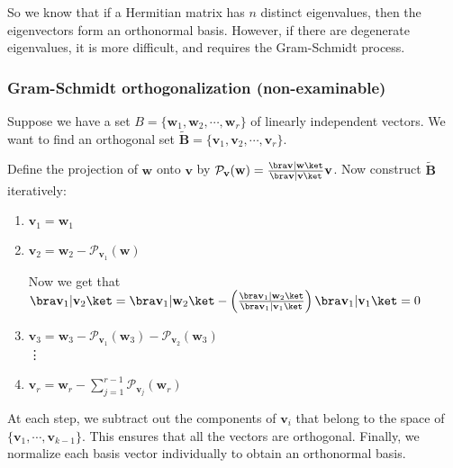 \documentclass[a4paper]{article}
\begin{document}
So we know that if a Hermitian matrix has $n$ distinct eigenvalues, then the eigenvectors form an orthonormal basis. However, if there are degenerate eigenvalues, it is more difficult, and requires the Gram-Schmidt process.

\subsubsection{Gram-Schmidt orthogonalization (non-examinable)}
Suppose we have a set $B = \{\mathbf{w}_1, \mathbf{w}_2, \cdots, \mathbf{w}_r\}$ of linearly independent vectors. We want to find an orthogonal set $\tilde{\mathbf{B}} = \{\mathbf{v}_1, \mathbf{v}_2, \cdots, \mathbf{v}_r\}$.

Define the projection of $\mathbf{w}$ onto $\mathbf{v}$ by $\mathcal{P}_\mathbf{v}(\mathbf{w}) = \frac{\bra \mathbf{v}|\mathbf{w}\ket}{\bra \mathbf{v}|\mathbf{v}\ket} \mathbf{v}$. Now construct $\tilde{\mathbf{B}}$ iteratively:
\begin{enumerate}
  \item $\mathbf{v}_1 = \mathbf{w}_1$
  \item $\mathbf{v}_2 = \mathbf{w}_2 - \mathcal{P}_{\mathbf{v}_1}(\mathbf{w})$

    Now we get that $\bra \mathbf{v}_1|\mathbf{v}_2\ket = \bra \mathbf{v}_1|\mathbf{w}_2\ket - \left(\frac{\bra \mathbf{v}_1|\mathbf{w}_2\ket}{\bra \mathbf{v}_1 | \mathbf{v}_1\ket}\right) \bra \mathbf{v}_1|\mathbf{v}_1\ket = 0$
  \item $\mathbf{v}_3 = \mathbf{w}_3 - \mathcal{P}_{\mathbf{v}_1}(\mathbf{w}_3) - \mathcal{P}_{\mathbf{v}_2}(\mathbf{w}_3)$\\
    \vdots
  \item $\displaystyle \mathbf{v}_r = \mathbf{w}_r - \sum_{j = 1}^{r - 1} \mathcal{P}_{\mathbf{v}_j}(\mathbf{w}_r)$
\end{enumerate}
At each step, we subtract out the components of $\mathbf{v}_i$ that belong to the space of $\{\mathbf{v}_1, \cdots, \mathbf{v}_{k - 1}\}$. This ensures that all the vectors are orthogonal. Finally, we normalize each basis vector individually to obtain an orthonormal basis.
\end{document}
